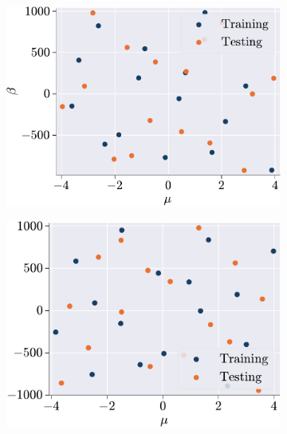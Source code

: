 \documentclass[11pt]{article}
\begin{document}
\begin{figure}[t]
\centering
\begin{subfigure}[b]{0.45\linewidth}
\centering
\includegraphics[width=\linewidth]{param_list_L.pdf}
\caption{}
\label{fig:HFS_HC_a}
\end{subfigure}
\begin{subfigure}[b]{0.45\linewidth}
\centering
\includegraphics[width=0.98\linewidth]{param_list_NL.pdf}
\caption{}
\label{fig:HFS_HC_b}
\end{subfigure}


\end{figure}
\end{document}
